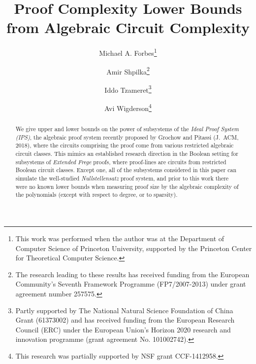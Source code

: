 \documentclass{toc}
\begin{document}
%

\begin{frontmatter}%

%
%
%

%
%

%
%


%
%
\title{Proof Complexity Lower Bounds from Algebraic Circuit Complexity}

%
%
%
%
%
%
%
%
%
%
%
%


%
%
%
%

%

\author[forbes]{Michael A. Forbes\thanks{This work was performed when the author was
at the Department of Computer Science of Princeton University, supported by the Princeton Center
for Theoretical Computer Science.}}
\author[shpilka]{Amir Shpilka\thanks{The research leading to these results has received funding from the European Community's Seventh Framework Programme (FP7/2007-2013) under grant agreement number 257575.}}
\author[tzameret]{Iddo Tzameret\thanks{Partly supported by The National Natural Science Foundation of China Grant (61373002) and has received funding from the European Research Council (ERC) under the European Union's Horizon 2020 research and innovation programme (grant agreement No. 101002742).}}
\author[wigderson]{Avi Wigderson\thanks{This research was partially supported by NSF grant CCF-1412958.}}
%
%
%
%

%
%
%
%
%
%
%
%
%
%
%
%
\begin{abstract}
  We give upper and lower bounds on the power of subsystems of the \emph{Ideal Proof System (IPS)}, the algebraic proof system recently proposed by
%
Grochow and Pitassi (J.~ACM, 2018),  %
%
where the circuits comprising the proof come from various restricted algebraic circuit classes. This mimics an established research direction in the Boolean setting for subsystems of \emph{Extended Frege} proofs, where proof-lines are circuits from restricted Boolean circuit classes. Except one, all of the subsystems considered in this paper can simulate the well-studied \emph{Nullstellensatz} proof system, and prior to this work there were no known lower bounds when measuring proof size by the algebraic complexity of the polynomials (except with respect to degree, or to sparsity).


\end{abstract}
\end{frontmatter}
\end{document}
